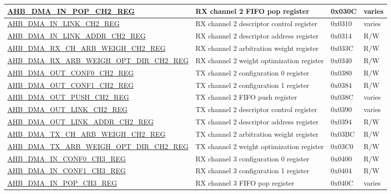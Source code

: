 \begin{longtable}{ | l | p{10cm} | p{1.3cm} | l | }
\hyperref[regdesc:AHBDMAINPOPCHNREG]{AHB\_DMA\_IN\_POP\_CH2\_REG} & RX channel 2 FIFO pop register & 0x030C & varies \\ \hline
\hyperref[regdesc:AHBDMAINLINKCHNREG]{AHB\_DMA\_IN\_LINK\_CH2\_REG} & RX channel 2 descriptor control register & 0x0310 & varies \\ \hline
\hyperref[regdesc:AHBDMAINLINKADDRCHNREG]{AHB\_DMA\_IN\_LINK\_ADDR\_CH2\_REG} & RX channel 2 descriptor address register & 0x0314 & R/W \\ \hline
\hyperref[regdesc:AHBDMARXCHARBWEIGHCHNREG]{AHB\_DMA\_RX\_CH\_ARB\_WEIGH\_CH2\_REG} & RX channel 2 arbitration weight register & 0x033C & R/W \\ \hline
\hyperref[regdesc:AHBDMARXARBWEIGHOPTDIRCHNREG]{AHB\_DMA\_RX\_ARB\_WEIGH\_OPT\_DIR\_CH2\_REG} & RX channel 2 weight optimization register & 0x0340 & R/W \\ \hline
\hyperref[regdesc:AHBDMAOUTCONF0CHNREG]{AHB\_DMA\_OUT\_CONF0\_CH2\_REG} & TX channel 2 configuration 0 register & 0x0380 & R/W \\ \hline
\hyperref[regdesc:AHBDMAOUTCONF1CHNREG]{AHB\_DMA\_OUT\_CONF1\_CH2\_REG} & TX channel 2 configuration 1 register & 0x0384 & R/W \\ \hline
\hyperref[regdesc:AHBDMAOUTPUSHCHNREG]{AHB\_DMA\_OUT\_PUSH\_CH2\_REG} & TX channel 2 FIFO push register & 0x038C & varies \\ \hline
\hyperref[regdesc:AHBDMAOUTLINKCHNREG]{AHB\_DMA\_OUT\_LINK\_CH2\_REG} & TX channel 2 descriptor control register & 0x0390 & varies \\ \hline
\hyperref[regdesc:AHBDMAOUTLINKADDRCHNREG]{AHB\_DMA\_OUT\_LINK\_ADDR\_CH2\_REG} & TX channel 2 descriptor address register & 0x0394 & R/W \\ \hline
\hyperref[regdesc:AHBDMATXCHARBWEIGHCHNREG]{AHB\_DMA\_TX\_CH\_ARB\_WEIGH\_CH2\_REG} & TX channel 2 arbitration weight register & 0x03BC & R/W \\ \hline
\hyperref[regdesc:AHBDMATXARBWEIGHOPTDIRCHNREG]{AHB\_DMA\_TX\_ARB\_WEIGH\_OPT\_DIR\_CH2\_REG} & TX channel 2 weight optimization register & 0x03C0 & R/W \\ \hline
\hyperref[regdesc:AHBDMAINCONF0CHNREG]{AHB\_DMA\_IN\_CONF0\_CH3\_REG} & RX channel 3 configuration 0 register & 0x0400 & R/W \\ \hline
\hyperref[regdesc:AHBDMAINCONF1CHNREG]{AHB\_DMA\_IN\_CONF1\_CH3\_REG} & RX channel 3 configuration 1 register & 0x0404 & R/W \\ \hline
\hyperref[regdesc:AHBDMAINPOPCHNREG]{AHB\_DMA\_IN\_POP\_CH3\_REG} & RX channel 3 FIFO pop register & 0x040C & varies \\ \hline

\end{longtable}
